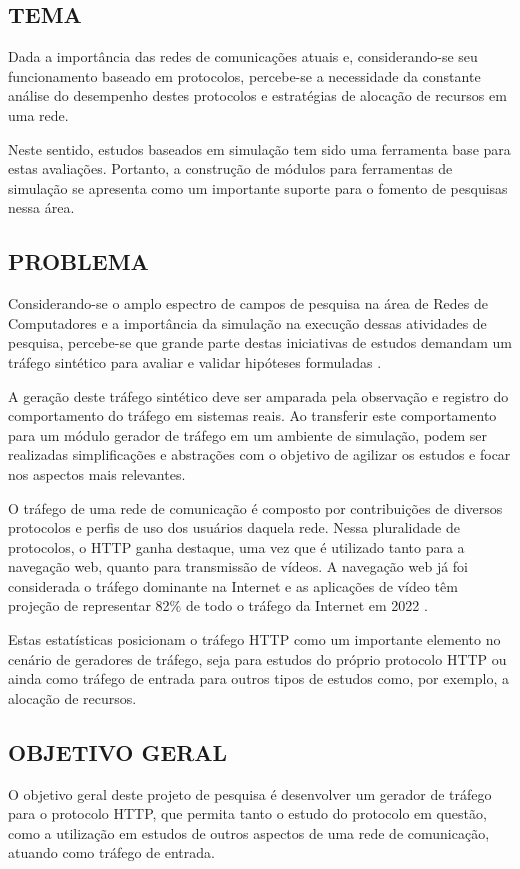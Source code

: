 \subsection{TEMA}
\label{subsec:tema}
Dada a importância das redes de comunicações atuais e, considerando-se seu funcionamento baseado em protocolos, percebe-se a necessidade da constante análise do desempenho destes protocolos e estratégias de alocação de recursos em uma rede.

Neste sentido, estudos baseados em simulação tem sido uma ferramenta base para estas avaliações. Portanto, a construção de módulos para ferramentas de simulação se apresenta como um importante suporte para o fomento de pesquisas nessa área. 


\subsection{PROBLEMA}
\label{subsec:problema}
Considerando-se o amplo espectro de campos de pesquisa na área de Redes de Computadores e a importância da simulação na execução dessas atividades de pesquisa, percebe-se que grande parte destas iniciativas de estudos demandam um tráfego sintético para avaliar e validar hipóteses formuladas \cite{Cheng2013}.

A geração deste tráfego sintético deve ser amparada pela observação e registro do comportamento do tráfego em sistemas reais. Ao transferir este comportamento para um módulo gerador de tráfego em um ambiente de simulação, podem ser realizadas simplificações e abstrações com o objetivo de agilizar os estudos e focar nos aspectos mais relevantes.

O tráfego de uma rede de comunicação é composto por contribuições de diversos protocolos e perfis de uso dos usuários daquela rede. Nessa pluralidade de protocolos, o HTTP ganha destaque, uma vez que é utilizado tanto para a navegação web, quanto para transmissão de vídeos. A navegação web já foi considerada o tráfego dominante na Internet \cite{Pries2012} e as aplicações de vídeo têm projeção de representar 82\% de todo o tráfego da Internet em 2022 \cite{cisco-newsroom-vni-2017-2022}.

Estas estatísticas posicionam o tráfego HTTP como um importante elemento no cenário de geradores de tráfego, seja para estudos do próprio protocolo HTTP ou ainda como tráfego de entrada para outros tipos de estudos como, por exemplo, a alocação de recursos.


\subsection{OBJETIVO GERAL}
\label{subsec:objetivo-geral}
O objetivo geral deste projeto de pesquisa é desenvolver um gerador de tráfego para o protocolo HTTP, que permita tanto o estudo do protocolo em questão, como a utilização em estudos de outros aspectos de uma rede de comunicação, atuando como tráfego de entrada.

